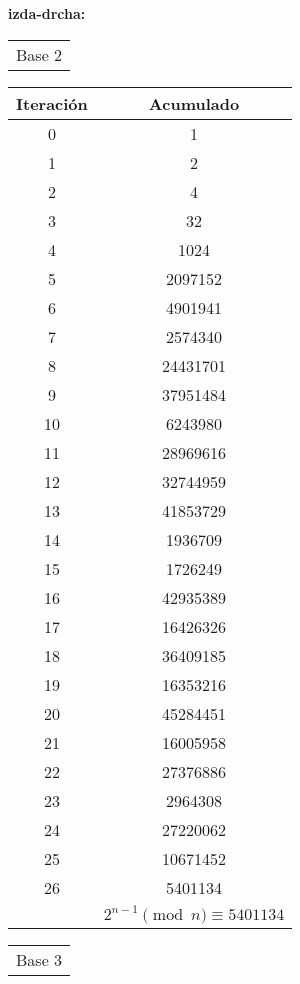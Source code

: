 \documentclass[fleqn]{article}
\begin{document}
    \textbf{izda-drcha:}

        \begin{tabular}{c}
            Base 2 \\
        \end{tabular}
        \begin{tabular}{c | c}
            Iteración & Acumulado \\ \hline
            0 & 1 \\
            1 & 2   \\
            2 & 4   \\
            3 & 32      \\
            4 & 1024        \\
            5 & 2097152     \\
            6 & 4901941     \\
            7 & 2574340     \\
            8 & 24431701    \\
            9 & 37951484    \\
            10 & 6243980     \\
            11 & 28969616    \\
            12 & 32744959    \\
            13 & 41853729    \\
            14 & 1936709     \\
            15 & 1726249     \\
            16 & 42935389    \\
            17 & 16426326    \\
            18 & 36409185    \\
            19 & 16353216    \\
            20 & 45284451    \\
            21 & 16005958    \\
            22 & 27376886    \\
            23 & 2964308     \\
            24 & 27220062    \\
            25 & 10671452    \\
            26 & 5401134     \\ \hline
            & $ 2^{n-1} \pmod{n} \equiv  5401134 $
        \end{tabular}
        \begin{tabular}{c}
            Base 3 \\
        \end{tabular}
\end{document}
